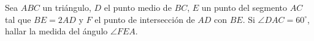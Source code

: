 Sea $ ABC$ un triángulo, $ D$ el punto medio de $ BC$, $ E$ un punto del segmento $ AC$ tal que $ BE = 2AD$ y $ F$ el punto de intersección de $ AD$ con $ BE$. Si $\angle DAC = 60^{\circ}$, hallar la medida del ángulo $\angle FEA$.
